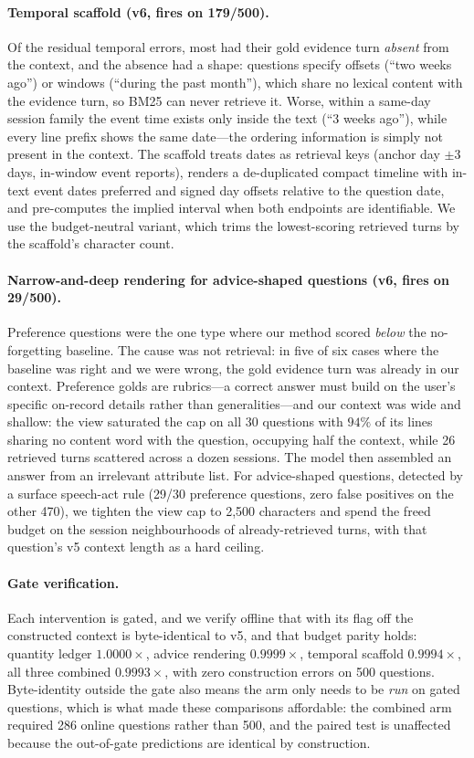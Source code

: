 \documentclass[11pt]{article}
\begin{document}
\paragraph{Temporal scaffold (v6, fires on 179/500).} Of the residual temporal errors, most had their gold evidence turn \emph{absent} from the context, and the absence had a shape: questions specify offsets (``two weeks ago'') or windows (``during the past month''), which share no lexical content with the evidence turn, so BM25 can never retrieve it. Worse, within a same-day session family the event time exists only inside the text (``3 weeks ago''), while every line prefix shows the same date---the ordering information is simply not present in the context. The scaffold treats dates as retrieval keys (anchor day $\pm 3$ days, in-window event reports), renders a de-duplicated compact timeline with in-text event dates preferred and signed day offsets relative to the question date, and pre-computes the implied interval when both endpoints are identifiable. We use the budget-neutral variant, which trims the lowest-scoring retrieved turns by the scaffold's character count.

\paragraph{Narrow-and-deep rendering for advice-shaped questions (v6, fires on 29/500).} Preference questions were the one type where our method scored \emph{below} the no-forgetting baseline. The cause was not retrieval: in five of six cases where the baseline was right and we were wrong, the gold evidence turn was already in our context. Preference golds are rubrics---a correct answer must build on the user's specific on-record details rather than generalities---and our context was wide and shallow: the view saturated the cap on all 30 questions with $94\%$ of its lines sharing no content word with the question, occupying half the context, while 26 retrieved turns scattered across a dozen sessions. The model then assembled an answer from an irrelevant attribute list. For advice-shaped questions, detected by a surface speech-act rule (29/30 preference questions, zero false positives on the other 470), we tighten the view cap to 2{,}500 characters and spend the freed budget on the session neighbourhoods of already-retrieved turns, with that question's v5 context length as a hard ceiling.

\paragraph{Gate verification.} Each intervention is gated, and we verify offline that with its flag off the constructed context is byte-identical to v5, and that budget parity holds: quantity ledger $1.0000\times$, advice rendering $0.9999\times$, temporal scaffold $0.9994\times$, all three combined $0.9993\times$, with zero construction errors on 500 questions. Byte-identity outside the gate also means the arm only needs to be \emph{run} on gated questions, which is what made these comparisons affordable: the combined arm required 286 online questions rather than 500, and the paired test is unaffected because the out-of-gate predictions are identical by construction.
\end{document}
